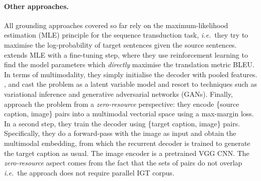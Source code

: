 \documentclass{svjour3}
\newcommand{\ie}[1]{\textit{i.e.}~#1}
\begin{document}
\paragraph{\textbf{Other approaches.}}
All grounding approaches covered so far rely on the maximum-likelihood estimation (MLE) principle for the sequence transduction task, \ie{}they try to maximise the log-probability of target sentences given the source sentences. \cite{zheng-EtAl:2018:WMT} extends MLE with a fine-tuning step, where they use reinforcement learning to find the model parameters which \textit{directly} maximise the translation metric BLEU. In terms of multimodality, they simply initialise the decoder with pooled features.
\citet{toyama-2016-latent}, \citet{calixto-2018-latent} and \citet{delbrouck-adversarial-2019} cast the problem as a latent variable model and resort to techniques such as variational inference and generative adversarial networks (GANs).
Finally, \citet{nakayama-zmt-2017} approach the problem from a \textit{zero-resource} perspective: they encode \{source caption, image\} pairs into a multimodal vectorial space using a max-margin loss. In a second step, they train the decoder using \{target caption, image\} pairs. Specifically, they do a forward-pass with the image as input and obtain the multimodal embedding, from which the recurrent decoder is trained to generate the target caption as usual. The image encoder is a pretrained VGG CNN. The \textit{zero-resource} aspect comes from the fact that the sets of pairs do not overlap \ie{}the approach does not require parallel IGT corpus.
\end{document}
